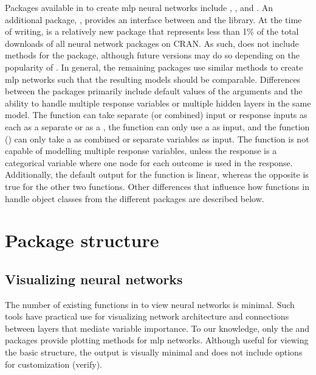 \documentclass[article]{jss}\usepackage[]{graphicx}\usepackage[]{color}
\begin{document}
Packages available in  to create \ac{mlp} neural networks include , , and . An additional package, , provides an interface between  and the   library.  At the time of writing,  is a relatively new package that represents less than 1\% of the total downloads of all neural network packages on CRAN.  As such,  does not include methods for the  package, although future versions may do so depending on the popularity of .  In general, the remaining packages use similar methods to create \ac{mlp} networks such that the resulting models should be comparable.  Differences between the packages primarily include default values of the arguments and the ability to handle multiple response variables or multiple hidden layers in the same model.  The  function can take separate (or combined) input or response inputs as each as a separate  or as a , the  function can only use a  as input, and the  function () can only take a  as combined or separate variables as input.  The  function is not capable of modelling multiple response variables, unless the response is a categorical variable where one node for each outcome is used in the response.  Additionally, the default output for the  function is linear, whereas the opposite is true for the other two functions.  Other differences that influence how functions in  handle object classes from the different packages are described below. 

\section[Package structure]{Package structure}

\subsection{Visualizing neural networks}

The number of existing functions in  to view neural networks is minimal.  Such tools have practical use for visualizing network architecture and connections between layers that mediate variable importance. To our knowledge, only the  and  packages provide plotting methods for \ac{mlp} networks.  Although useful for viewing the basic structure, the output is visually minimal and does not include options for customization (verify).
\end{document}
